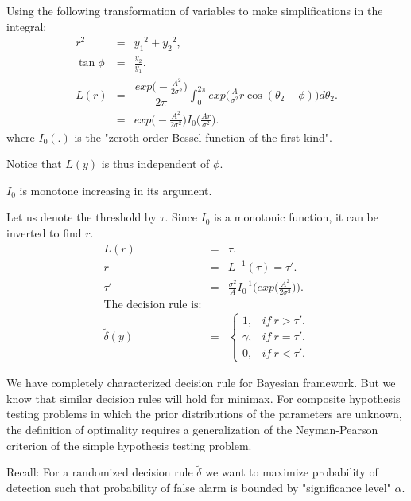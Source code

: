 \documentclass[a4paper,english,12pt]{article}
\begin{document}
\begin{exmp}
Using the following transformation of variables to make simplifications in the integral:
\begin{eqnarray}
r^2 &=& {y_1}^2 + {y_2}^2,\\
\tan\phi &=& \frac{y_2}{y_1}.\\
L(r) &=& \dfrac{exp\big(-\frac{A^2}{2\sigma^2}\big)}{2\pi}\int_{0}^{2\pi}exp\big(\frac{A}{\sigma^2}r\cos(\theta_2 - \phi)\big)d\theta_2.\\
&=& exp\big(-\frac{A^2}{2\sigma^2}\big)I_0\big(\frac{Ar}{\sigma^2}\big).
\end{eqnarray}
where $I_0(.)$ is the "zeroth order Bessel function of the first kind".

\begin{note} 
Notice that $L(y)$ is thus independent of $\phi$.
\end{note}
\begin{note}
$I_0$ is monotone increasing in its argument.
\end{note}

Let us denote the threshold by $\tau$. Since $I_0$ is a monotonic function, it can be inverted to find $r$.
\begin{eqnarray}
L(r) &=& \tau.\\
r &=& L^{-1}(\tau) = \tau'.\\
\tau' &=& \frac{\sigma^2}{A}I_0^{-1}\Big(exp\big(\frac{A^2}{2\sigma^2}\big)\Big).\\
\text{The decision rule is:} \nonumber\\
\tilde{\delta}(y) &=&
\begin{cases}
1, &if~ r > \tau'.\\
\gamma, &if~ r = \tau'.\\
0, &if~ r < \tau'.
\end{cases}
\end{eqnarray}
\end{exmp}

We have completely characterized decision rule for Bayesian framework. But we know that similar decision rules will hold for minimax. For composite hypothesis testing problems in which the prior distributions of the parameters are unknown, the definition of optimality requires a generalization of the Neyman-Pearson criterion of the simple hypothesis testing problem.

Recall: For a randomized decision rule $\tilde{\delta}$ we want to maximize probability of detection such that probability of false alarm is bounded by "significance level" $\alpha$.
\end{document}
